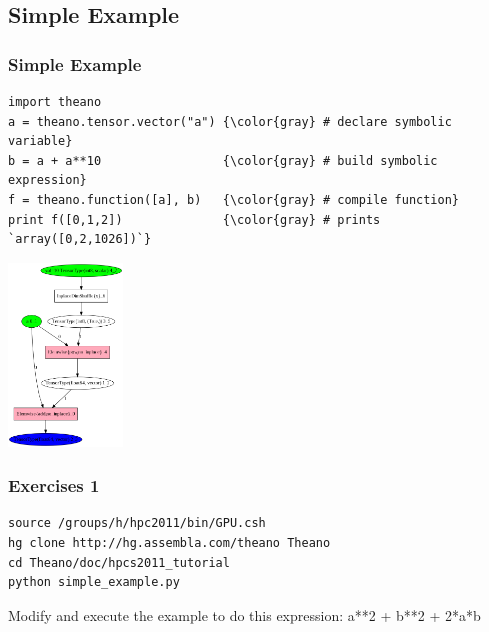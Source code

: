 \documentclass[a4paper,9pt]{beamer}
\begin{document}
\newcommand\codeHighlight[1]{\textcolor[rgb]{1,0,0}{\textbf{#1}}}
\subsection{Simple Example}

\begin{frame}[fragile]
  \frametitle{Simple Example}
\begin{Verbatim}[commandchars=\\\{\}]
import theano
a = theano.tensor.vector("a") {\color{gray} # declare symbolic variable}
b = a + a**10                 {\color{gray} # build symbolic expression}
f = theano.function([a], b)   {\color{gray} # compile function}
print f([0,1,2])              {\color{gray} # prints `array([0,2,1026])`}
\end{Verbatim}
  \includegraphics[width=1.2in]{pics/f_unoptimized.png}
\end{frame}


\begin{frame}[fragile]
  \frametitle{Exercises 1}
  \begin{Verbatim}
source /groups/h/hpc2011/bin/GPU.csh
hg clone http://hg.assembla.com/theano Theano
cd Theano/doc/hpcs2011_tutorial
python simple_example.py
  \end{Verbatim}
  \vfill
Modify and execute the example to do this expression: a**2 + b**2 + 2*a*b
\end{frame}
\end{document}
